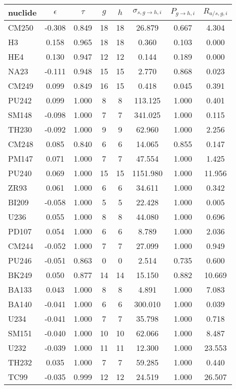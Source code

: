 \begin{tabular}{|l|ccccccc|}
\hline
nuclide & $\epsilon$ & $\tau$ & $g$ & $h$ & $\sigma_{s,g\to h,i}$ & $P_{g\to h,i}$ & $R_{a/s,g,i}$\\
\hline
CM250 & -0.308 & 0.849 & 18 & 18 & 26.879 & 0.667 & 4.304\\
H3 & 0.158 & 0.965 & 18 & 18 & 0.360 & 0.103 & 0.000\\
HE4 & 0.130 & 0.947 & 12 & 12 & 0.144 & 0.189 & 0.000\\
NA23 & -0.111 & 0.948 & 15 & 15 & 2.770 & 0.868 & 0.023\\
CM249 & 0.099 & 0.849 & 16 & 15 & 0.418 & 0.045 & 0.391\\
PU242 & 0.099 & 1.000 & 8 & 8 & 113.125 & 1.000 & 0.401\\
SM148 & -0.098 & 1.000 & 7 & 7 & 341.025 & 1.000 & 0.115\\
TH230 & -0.092 & 1.000 & 9 & 9 & 62.960 & 1.000 & 2.256\\
CM248 & 0.085 & 0.840 & 6 & 6 & 14.065 & 0.855 & 0.147\\
PM147 & 0.071 & 1.000 & 7 & 7 & 47.554 & 1.000 & 1.425\\
PU240 & 0.069 & 1.000 & 15 & 15 & 1151.980 & 1.000 & 11.956\\
ZR93 & 0.061 & 1.000 & 6 & 6 & 34.611 & 1.000 & 0.342\\
BI209 & -0.058 & 1.000 & 5 & 5 & 22.428 & 1.000 & 0.005\\
U236 & 0.055 & 1.000 & 8 & 8 & 44.080 & 1.000 & 0.696\\
PD107 & 0.054 & 1.000 & 6 & 6 & 8.789 & 1.000 & 2.036\\
CM244 & -0.052 & 1.000 & 7 & 7 & 27.099 & 1.000 & 0.949\\
PU246 & -0.051 & 0.863 & 0 & 0 & 2.514 & 0.735 & 0.600\\
BK249 & 0.050 & 0.877 & 14 & 14 & 15.150 & 0.882 & 10.669\\
BA133 & 0.043 & 1.000 & 8 & 8 & 4.891 & 1.000 & 7.083\\
BA140 & -0.041 & 1.000 & 6 & 6 & 300.010 & 1.000 & 0.039\\
U234 & -0.041 & 1.000 & 7 & 7 & 35.798 & 1.000 & 0.718\\
SM151 & -0.040 & 1.000 & 10 & 10 & 62.066 & 1.000 & 8.487\\
U232 & -0.039 & 1.000 & 11 & 11 & 12.300 & 1.000 & 23.553\\
TH232 & 0.035 & 1.000 & 7 & 7 & 59.285 & 1.000 & 0.440\\
TC99 & -0.035 & 0.999 & 12 & 12 & 24.519 & 1.000 & 26.507\\

\end{tabular}

